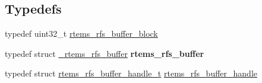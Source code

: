 \subsection*{Typedefs}
\begin{DoxyCompactItemize}
\item 
typedef uint32\+\_\+t \mbox{\hyperlink{rtems-rfs-buffer_8h_a5650d53328a5af0a78198fe780aec043}{rtems\+\_\+rfs\+\_\+buffer\+\_\+block}}
\item 
\mbox{\label{rtems-rfs-buffer_8h_a6965d5fc4dd67f79945301931fbcb367}} 
typedef struct \mbox{\hyperlink{struct__rtems__rfs__buffer}{\+\_\+rtems\+\_\+rfs\+\_\+buffer}} {\bfseries rtems\+\_\+rfs\+\_\+buffer}
\item 
typedef struct \mbox{\hyperlink{structrtems__rfs__buffer__handle__t}{rtems\+\_\+rfs\+\_\+buffer\+\_\+handle\+\_\+t}} \mbox{\hyperlink{rtems-rfs-buffer_8h_a17f97c37c5273ad28d413dfd2d175e23}{rtems\+\_\+rfs\+\_\+buffer\+\_\+handle}}
\end{DoxyCompactItemize}
